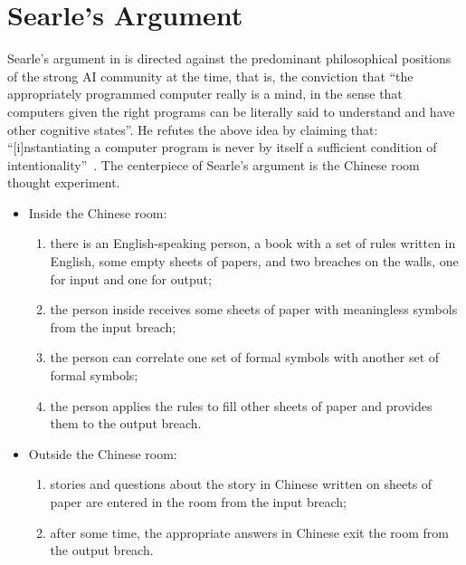 \section{Searle's Argument}

Searle's argument in \cite{searle1980minds} is directed against the predominant philosophical positions of the strong AI community at the time, that is, the conviction that ``the appropriately programmed computer really is a mind, in the sense that computers given the right programs can be literally said to understand and have other cognitive states''. He refutes the above idea by claiming that: ``[i]nstantiating a computer program is never by itself a sufficient condition of intentionality''~\cite[p.~417]{searle1980minds}. The centerpiece of Searle's argument is the Chinese room thought experiment. 

\begin{itemize}
    \item Inside the Chinese room:
    \begin{enumerate}
        \item there is an English-speaking person, a book with a set of rules written in English, some empty sheets of papers, and two breaches on the walls, one for input and one for output;
        \item the person inside receives some sheets of paper with meaningless symbols from the input breach;
        \item the person can correlate one set of formal symbols with another set of formal symbols;
        \item the person applies the rules to fill other sheets of paper and provides them to the output breach.
    \end{enumerate}
    \item Outside the Chinese room:
    \begin{enumerate}
        \item stories and questions about the story in Chinese written on sheets of paper are entered in the room from the input breach;
        \item after some time, the appropriate answers in Chinese exit the room from the output breach.
    \end{enumerate}
\end{itemize}

